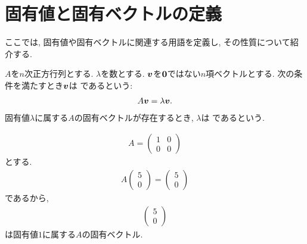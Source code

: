 \section{固有値と固有ベクトルの定義}
ここでは, 固有値や固有ベクトルに関連する用語を定義し,
その性質について紹介する.
\begin{definition}
  \label{def:eigen}
  $A$を$n$次正方行列とする.
  $\lambda$を数とする.
  $\boldsymbol{v}$を$\boldsymbol{0}$ではない$n$項ベクトルとする.
  次の条件を満たすとき$\boldsymbol{v}$は
  であるという:
  \begin{align*}
    A\boldsymbol{v}=\lambda\boldsymbol{v}.
  \end{align*}
  固有値$\lambda$に属する$A$の固有ベクトルが存在するとき,
  $\lambda$は
  であるという.
\end{definition}



\begin{example}
  \begin{align*}
    A=\begin{pmatrix}1&0\\0&0\end{pmatrix}
  \end{align*}
  とする.
  \begin{align*}
    A\begin{pmatrix}5\\0\end{pmatrix}=\begin{pmatrix}5\\0\end{pmatrix}
  \end{align*}
  であるから,
  \begin{align*}
    \begin{pmatrix}5\\0\end{pmatrix}
  \end{align*}
  は固有値$1$に属する$A$の固有ベクトル.
\end{example}

